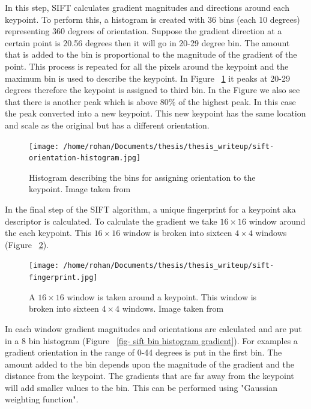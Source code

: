 \documentclass[12pt]{dalcsthesis}
\begin{document}
In this step, SIFT calculates gradient magnitudes and directions around each keypoint. To perform this, a histogram is created with 36 bins (each 10 degrees) representing 360 degrees of orientation. Suppose the gradient direction at a certain point is 20.56 degrees then it will go in 20-29 degree bin. The amount that is added to the bin is proportional to the magnitude of the gradient of the point. This process is repeated for all the pixels around the keypoint and the maximum bin is used to describe the keypoint. In Figure ~\ref{fig- sift bin histogram} it peaks at 20-29 degrees therefore the keypoint is assigned to third bin. In the Figure we also see that there is another peak which is above 80\% of the highest peak. In this case the peak converted into a new keypoint. This new keypoint has the same location and scale as the original but has a different orientation. 

\begin{figure}
  \centering
     {\texttt{[image: /home/rohan/Documents/thesis/thesis\_writeup/sift-orientation-histogram.jpg]}}
  \caption{\label{fig- sift bin histogram} Histogram describing the bins for assigning orientation to the keypoint. Image taken from \cite{sift_url}}
\end{figure}

In the final step of the SIFT algorithm, a unique fingerprint for a keypoint aka descriptor is calculated. To calculate the gradient we take $16 \times 16$ window around the each keypoint. This $16 \times 16$ window is broken into sixteen $4 \times 4$ windows (Figure ~\ref{fig- sift bin fingerprint}).

\begin{figure}
  \centering
     {\texttt{[image: /home/rohan/Documents/thesis/thesis\_writeup/sift-fingerprint.jpg]}}
  \caption{\label{fig- sift bin fingerprint} A $16 \times 16$ window is taken around a keypoint. This window is broken into sixteen $4 \times 4$ windows. Image taken from \cite{sift_url}}
\end{figure}

In each window gradient magnitudes and orientations are calculated and are put in a 8 bin histogram (Figure ~\ref{fig- sift bin histogram gradient}). For examples a gradient orientation in the range of 0-44 degrees is put in the first bin. The amount added to the bin depends upon the magnitude of the gradient and the distance from the keypoint. The gradients that are far away from the keypoint will add smaller values to the bin. This can be performed using "Gaussian weighting function". 
\end{document}
